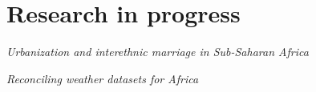 \documentclass[10pt,letterpaper]{article}
\renewenvironment{itemize}{
  \begin{list}{}{
    \setlength{\leftmargin}{1.5em}
  }
}{
  \end{list}
}
\begin{document}

\section*{Research in progress}


\begin{itemize}
\item \emph{Urbanization and interethnic marriage in Sub-Saharan Africa} 
\item \emph{Reconciling weather datasets for Africa}
\end{itemize}


\end{document}
